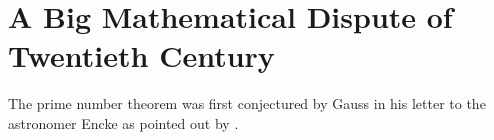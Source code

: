 \documentclass[elemannt.tex]{subfile}
\begin{document}
	\chapter{A Big Mathematical Dispute of Twentieth Century}\label{ch:dispute}
	The prime number theorem was first conjectured by Gauss in his letter to the astronomer Encke as pointed out by \textcite[pp. 37]{landau_1911}. 
\end{document}
